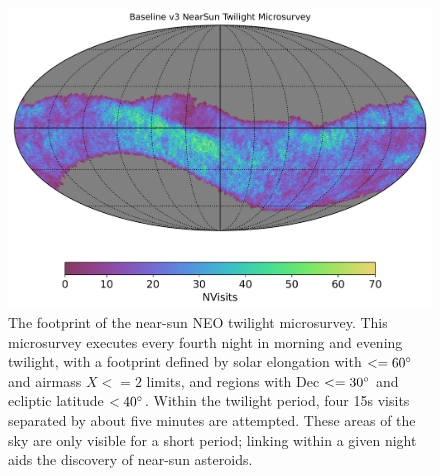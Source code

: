 \begin{figure}[t!]
    \centering
    \includegraphics[width=4.7in]{figures/v3TwilightMicrosurvey.png}
    \caption{The footprint of the near-sun NEO twilight microsurvey. This microsurvey executes every fourth night in morning and evening twilight, with a footprint defined by solar elongation with $<=60^{\circ}$ and airmass $X<=2$ limits, and regions with Dec $<= 30^{\circ}$ and ecliptic latitude $< 40^{\circ}$. Within the twilight period, four 15s visits separated by about five minutes are attempted. These areas of the sky are only visible for a short period; linking within a given night aids the discovery of near-sun asteroids. }\label{fig:baselinev3Micro}
\end{figure}
